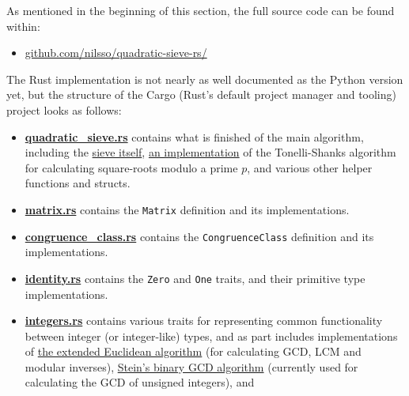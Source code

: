 \documentclass{report}
\begin{document}
\noindent
As mentioned in the beginning of this section, the full source code
can be found within:
\begin{itemize}
    \item \href{https://github.com/nilsso/quadratic-sieve-rs/tree/main/src}{github.com/nilsso/quadratic-sieve-rs/}
\end{itemize}
The Rust implementation is not nearly as well documented as the Python version
yet, but the structure of the Cargo (Rust's default project manager and
tooling) project looks as follows:
\begin{itemize}
    \item %
        \href{https://github.com/nilsso/quadratic-sieve-rs/blob/main/src/quadratic\_sieve.rs}{\textbf{quadratic\_sieve.rs}}
        contains what is finished of the main algorithm, including the
        \href{https://github.com/nilsso/quadratic-sieve-rs/blob/main/src/quadratic\_sieve.rs#L115}{sieve itself},
        \href{https://github.com/nilsso/quadratic-sieve-rs/blob/main/src/quadratic\_sieve.rs#L74}{an implementation}
        of the Tonelli-Shanks algorithm for calculating square-roots modulo a
        prime $p$, and various other helper functions and structs.
    \item %
        \href{https://github.com/nilsso/quadratic-sieve-rs/blob/main/src/matrix.rs}{\textbf{matrix.rs}}
        contains the \Verb+Matrix+ definition and its implementations.
    \item %
        \href{https://github.com/nilsso/quadratic-sieve-rs/blob/main/src/congruence\_class.rs}{\textbf{congruence\_class.rs}}
        contains the \Verb+CongruenceClass+ definition and its implementations.
    \item %
        \href{https://github.com/nilsso/quadratic-sieve-rs/blob/main/src/identity.rs}{\textbf{identity.rs}}
        contains the \Verb+Zero+ and \Verb+One+ traits, and their primitive type
        implementations.
    \item %
        \href{https://github.com/nilsso/quadratic-sieve-rs/blob/main/src/integers.rs}{\textbf{integers.rs}}
        contains various traits for representing common functionality between
        integer (or integer-like) types, and as part includes implementations of
        \href{https://github.com/nilsso/quadratic-sieve-rs/blob/main/src/integers.rs#L13}{the extended Euclidean algorithm}
        (for calculating GCD, LCM and modular inverses),
        \href{https://docs.rs/num-integer/0.1.44/src/num_integer/lib.rs.html#462}{Stein's binary GCD algorithm}
        (currently used for calculating the GCD of unsigned integers), and

\end{itemize}
\end{document}
